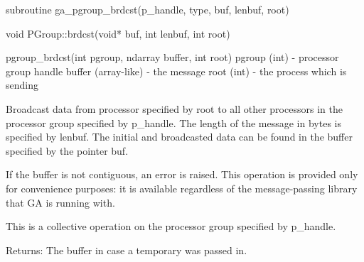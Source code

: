 \documentclass[12pt]{article}
\begin{document}
\begin{fapi}
\begin{fcode}
subroutine ga_pgroup_brdcst(p_handle, type, buf, lenbuf, root)
\end{fcode}
\begin{funcargs}
\end{funcargs}
\end{fapi}

\begin{cxxapi}
\begin{cxxcode}
void PGroup::brdcst(void* buf, int lenbuf, int root)
\end{cxxcode}
\begin{funcargs}
\end{funcargs}
\end{cxxapi}

\begin{pyapi}
\begin{pycode}
pgroup_brdcst(int pgroup, ndarray buffer, int root) 
   pgroup (int)        - processor group handle 
   buffer (array-like) - the message 
   root (int)          - the process which is sending 
\end{pycode}
\end{pyapi}

\begin{desc}

Broadcast data from processor specified by root to all other processors in the processor group specified by p_handle. The length of the message in bytes is specified by lenbuf. The initial and broadcasted data can be found in the buffer specified by the pointer buf.

If the buffer is not contiguous, an error is raised. This operation is provided only for convenience purposes: it is available regardless of the message-passing library that GA is running with.


This is a collective operation on the processor group specified by p_handle. 

Returns: 
The buffer in case a temporary was passed in. 
\end{desc}
\end{document}
